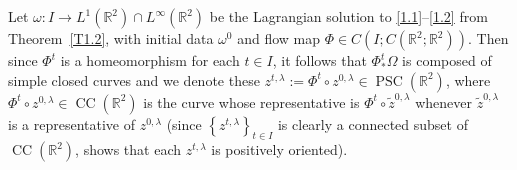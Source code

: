 \documentclass[reqno,centertags,12pt]{amsart}
\theoremstyle{definition}
\numberwithin{equation}{section}
\newcommand{\set}[1]{\left\{ #1 \right\}}
\newcommand{\bbR}{{\mathbb{R}}}
\begin{document}
Let $\omega\colon I\to L^{1}(\bbR^{2})\cap L^{\infty}(\bbR^{2})$ be the
Lagrangian solution to \eqref{1.1}--\eqref{1.2} from Theorem~\ref{T1.2}, with  initial data $\omega^{0}$
and  flow map $\Phi\in C\left(I;C(\bbR^{2};\bbR^{2})\right)$. Then since  $\Phi^{t}$ is a homeomorphism for each $t\in I$, 
it follows that $\Phi_{*}^{t}\Omega$ is  composed of simple closed curves and we denote these  $z^{t,\lambda}:=\Phi^{t}\circ z^{0,\lambda} \in\operatorname{PSC}(\bbR^{2})$, where $\Phi^{t}\circ z^{0,\lambda}\in \operatorname{CC}(\bbR^{2})$ is the curve whose representative is $\Phi^{t}\circ\tilde{z}^{0,\lambda}$ whenever  $\tilde{z}^{0,\lambda}$ is a representative of $z^{0,\lambda}$ (since $\set{z^{t,\lambda}}_{t\in I}$ is clearly a connected subset of $\operatorname{CC}(\bbR^{2})$,  \cite[Lemma~B.4]{JeoZlaTouching} shows that each $z^{t,\lambda}$ is positively oriented).
\end{document}
